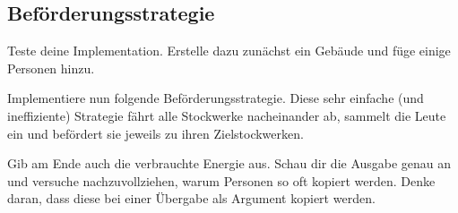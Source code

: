 

\subsection{Beförderungsstrategie}
Teste deine Implementation.
Erstelle dazu zunächst ein Gebäude und füge einige Personen hinzu.



Implementiere nun folgende Beförderungsstrategie.
Diese sehr einfache (und ineffiziente) Strategie fährt alle Stockwerke nacheinander ab, sammelt die Leute ein und befördert sie jeweils zu ihren Zielstockwerken.

\begin{algorithm}[H]
 \SetAlgoLined
\end{algorithm}

Gib am Ende auch die verbrauchte Energie aus.
Schau dir die Ausgabe genau an und versuche nachzuvollziehen, warum Personen so oft kopiert werden.
Denke daran, dass diese bei einer Übergabe als Argument kopiert werden.

